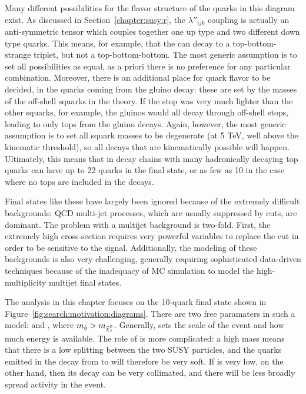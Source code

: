 Many different possibilities for the flavor structure of the quarks in this diagram exist. As discussed in Section~\ref{chapter:susy:r}, the  $\lambda''_{ijk}$ coupling is actually an anti-symmetric tensor which couples together one up type and two different down type quarks. This means, for example, that the \lsp can decay to a top-bottom-strange triplet, but not a top-bottom-bottom. The most generic assumption is to set all possibilities as equal, as a priori there is no preference for any particular combination. Moreover, there is an additional place for quark flavor to be decided, in the quarks coming from the gluino decay: these are set by the masses of the off-shell squarks in the theory. If the stop was very much lighter than the other squarks, for example, the gluinos would all decay through off-shell stops, leading to only tops from the gluino decays. Again, however, the most generic assumption is to set all squark masses to be degenerate (at 5 TeV, well above the kinematic threshold), so all decays that are kinematically possible will happen. Ultimately, this means that in decay chains with many hadronically decaying top quarks can have up to 22 quarks in the final state, or as few as 10 in the case where no tops are included in the decays. 

Final states like these have largely been ignored because of the extremely difficult backgrounds: QCD multi-jet processes, which are usually suppressed by \met cuts, are dominant. The problem with a multijet background is two-fold. First, the extremely high cross-section requires very powerful variables to replace the \met cut in order to be sensitive to the signal. Additionally, the modeling of these backgrounds is also very challenging, generally requiring sophisticated data-driven techniques because of the inadequacy of MC simulation to model the high-multiplicity multijet final states.

The analysis in this chapter focuses on the 10-quark final state shown in Figure~\ref{fig:search:motivation:diagrams}. There are two free paramaters in such a model: \mgluino and \mninoone, where $\mgluino > \mninoone$. Generally, \mgluino sets the scale of the event and how much energy is available. The role of \mninoone is more complicated: a high mass means that there is a low splitting between the two SUSY particles, and the quarks emitted in the decay from \gluino to \lsp will therefore be very soft. If \mninoone is very low, on the other hand, then its decay can be very collimated, and there will be less broadly spread activity in the event. 

